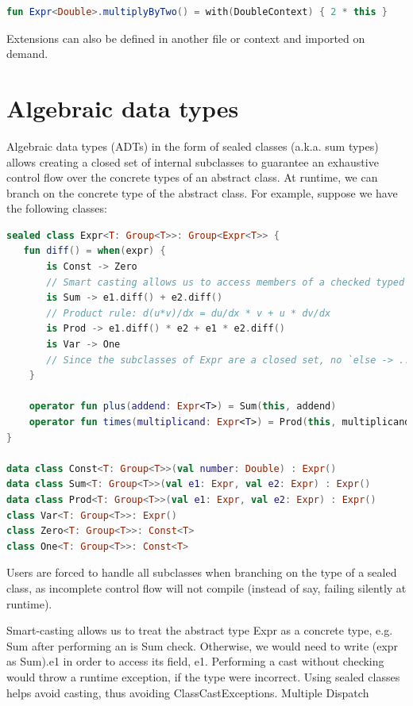 \documentclass[12pt,initial,twoside,maitrise]{dms}
\numberwithin{equation}{section}
\numberwithin{table}{chapter}
\numberwithin{figure}{chapter}
\begin{document}
\begin{lstlisting}[caption={Simple code listing.}, language=Kotlin]
fun Expr<Double>.multiplyByTwo() = with(DoubleContext) { 2 * this }
\end{lstlisting}

Extensions can also be defined in another file or context and imported on demand.

\section{Algebraic data types}\label{sec:algebraic-data-types}

Algebraic data types (ADTs) in the form of sealed classes (a.k.a. sum types) allows creating a closed set of internal subclasses to guarantee an exhaustive control flow over the concrete types of an abstract class. At runtime, we can branch on the concrete type of the abstract class. For example, suppose we have the following classes:

\begin{lstlisting}[caption={Simple code listing.}, language=Kotlin]
sealed class Expr<T: Group<T>>: Group<Expr<T>> {
   fun diff() = when(expr) {
       is Const -> Zero
       // Smart casting allows us to access members of a checked typed without explicit casting
       is Sum -> e1.diff() + e2.diff()
       // Product rule: d(u*v)/dx = du/dx * v + u * dv/dx
       is Prod -> e1.diff() * e2 + e1 * e2.diff()
       is Var -> One
       // Since the subclasses of Expr are a closed set, no `else -> ...` is required.
    }

    operator fun plus(addend: Expr<T>) = Sum(this, addend)
    operator fun times(multiplicand: Expr<T>) = Prod(this, multiplicand)
}

data class Const<T: Group<T>>(val number: Double) : Expr()
data class Sum<T: Group<T>>(val e1: Expr, val e2: Expr) : Expr()
data class Prod<T: Group<T>>(val e1: Expr, val e2: Expr) : Expr()
class Var<T: Group<T>>: Expr()
class Zero<T: Group<T>>: Const<T>
class One<T: Group<T>>: Const<T>
\end{lstlisting}

Users are forced to handle all subclasses when branching on the type of a sealed class, as incomplete control flow will not compile (instead of say, failing silently at runtime).

Smart-casting allows us to treat the abstract type Expr as a concrete type, e.g. Sum after performing an is Sum check. Otherwise, we would need to write (expr as Sum).e1 in order to access its field, e1. Performing a cast without checking would throw a runtime exception, if the type were incorrect. Using sealed classes helps avoid casting, thus avoiding ClassCastExceptions.
Multiple Dispatch
\end{document}
